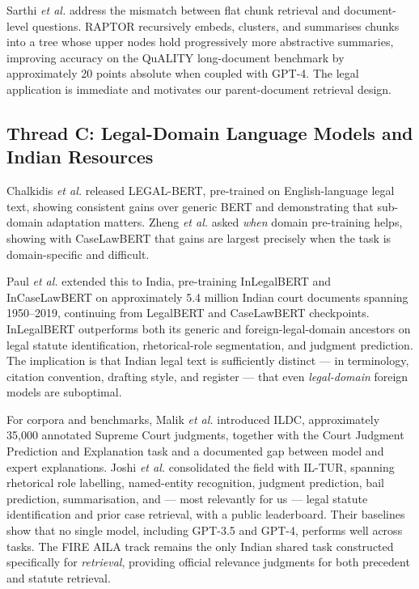 \documentclass[conference]{IEEEtran}
\begin{document}
Sarthi \textit{et al.} \cite{sarthi2024} address the mismatch between flat chunk retrieval and document-level questions. RAPTOR recursively embeds, clusters, and summarises chunks into a tree whose upper nodes hold progressively more abstractive summaries, improving accuracy on the QuALITY long-document benchmark by approximately 20 points absolute when coupled with GPT-4. The legal application is immediate and motivates our parent-document retrieval design.

\subsection{Thread C: Legal-Domain Language Models and Indian Resources}

Chalkidis \textit{et al.} \cite{chalkidis2020} released LEGAL-BERT, pre-trained on English-language legal text, showing consistent gains over generic BERT and demonstrating that sub-domain adaptation matters. Zheng \textit{et al.} \cite{zheng2021} asked \emph{when} domain pre-training helps, showing with CaseLawBERT that gains are largest precisely when the task is domain-specific and difficult.

Paul \textit{et al.} \cite{paul2023} extended this to India, pre-training InLegalBERT and InCaseLawBERT on approximately 5.4 million Indian court documents spanning 1950--2019, continuing from LegalBERT and CaseLawBERT checkpoints. InLegalBERT outperforms both its generic and foreign-legal-domain ancestors on legal statute identification, rhetorical-role segmentation, and judgment prediction. The implication is that Indian legal text is sufficiently distinct — in terminology, citation convention, drafting style, and register — that even \emph{legal-domain} foreign models are suboptimal.

For corpora and benchmarks, Malik \textit{et al.} \cite{malik2021} introduced ILDC, approximately 35{,}000 annotated Supreme Court judgments, together with the Court Judgment Prediction and Explanation task and a documented gap between model and expert explanations. Joshi \textit{et al.} \cite{joshi2024} consolidated the field with IL-TUR, spanning rhetorical role labelling, named-entity recognition, judgment prediction, bail prediction, summarisation, and — most relevantly for us — legal statute identification and prior case retrieval, with a public leaderboard. Their baselines show that no single model, including GPT-3.5 and GPT-4, performs well across tasks. The FIRE AILA track \cite{bhattacharya2019} remains the only Indian shared task constructed specifically for \emph{retrieval}, providing official relevance judgments for both precedent and statute retrieval.
\end{document}
